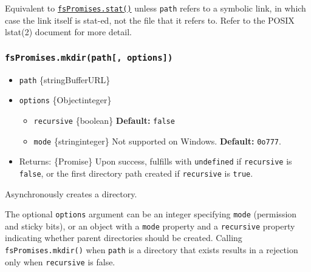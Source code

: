 Equivalent to
\hyperref[fspromisesstatpath-options]{\texttt{fsPromises.stat()}} unless
\texttt{path} refers to a symbolic link, in which case the link itself
is stat-ed, not the file that it refers to. Refer to the POSIX lstat(2)
document for more detail.

\subsubsection{\texorpdfstring{\texttt{fsPromises.mkdir(path{[},\ options{]})}}{fsPromises.mkdir(path{[}, options{]})}}\label{fspromises.mkdirpath-options}

\begin{itemize}
\tightlist
\item
  \texttt{path} \{string\textbar Buffer\textbar URL\}
\item
  \texttt{options} \{Object\textbar integer\}

  \begin{itemize}
  \tightlist
  \item
    \texttt{recursive} \{boolean\} \textbf{Default:} \texttt{false}
  \item
    \texttt{mode} \{string\textbar integer\} Not supported on Windows.
    \textbf{Default:} \texttt{0o777}.
  \end{itemize}
\item
  Returns: \{Promise\} Upon success, fulfills with \texttt{undefined} if
  \texttt{recursive} is \texttt{false}, or the first directory path
  created if \texttt{recursive} is \texttt{true}.
\end{itemize}

Asynchronously creates a directory.

The optional \texttt{options} argument can be an integer specifying
\texttt{mode} (permission and sticky bits), or an object with a
\texttt{mode} property and a \texttt{recursive} property indicating
whether parent directories should be created. Calling
\texttt{fsPromises.mkdir()} when \texttt{path} is a directory that
exists results in a rejection only when \texttt{recursive} is false.

